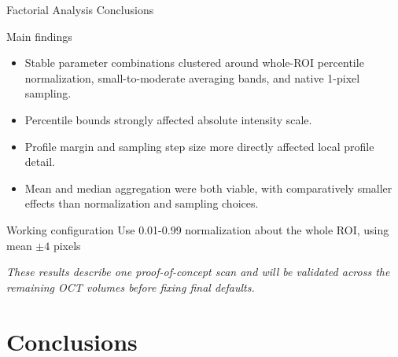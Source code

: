 \documentclass[aspectratio=169]{beamer}
\begin{document}
\begin{frame}{Factorial Analysis Conclusions}

\begin{block}{Main findings}

\begin{itemize}
    \item Stable parameter combinations clustered around whole-ROI percentile
    normalization, small-to-moderate averaging bands, and native 1-pixel
    sampling.
    \item Percentile bounds strongly affected absolute intensity scale.
    \item Profile margin and sampling step size more directly affected local
    profile detail.
    \item Mean and median aggregation were both viable, with comparatively
    smaller effects than normalization and sampling choices.
\end{itemize}

\end{block}

\vspace{0.25cm}

\begin{alertblock}{Working configuration}
Use 0.01-0.99 normalization about the whole ROI, using mean $\pm4$ pixels

\end{alertblock}

\vspace{0.2cm}

\centering
\textit{These results describe one proof-of-concept scan and will be
validated across the remaining OCT volumes before fixing final defaults.}

\end{frame}



\section{Conclusions}
\end{document}
